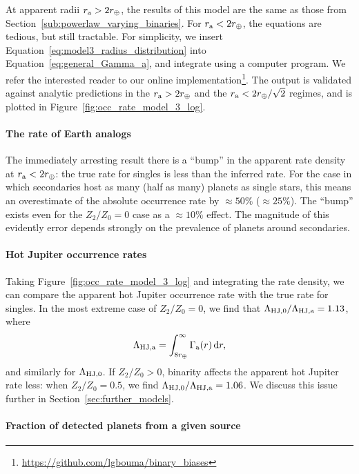\documentclass[12pt,modern]{aastex61}
\renewcommand{\a}{_{\rm a}}
\begin{document}
At apparent radii $r\a > 2r_\oplus$, the results of this model are the same as 
those from Section~\ref{sub:powerlaw_varying_binaries}.
For $r\a < 2r_\oplus$, the equations are tedious, but still tractable.
For simplicity, we insert Equation~\ref{eq:model3_radius_distribution} into 
Equation~\ref{eq:general_Gamma_a}, and integrate using a computer 
program. We refer the interested reader to our online 
implementation\footnote{\url{https://github.com/lgbouma/binary_biases}}.
The output is validated against analytic predictions in the $r\a > 
2r_\oplus$ and the $r\a < 2r_\oplus/\sqrt{2}$ regimes, and is plotted in
Figure~\ref{fig:occ_rate_model_3_log}.


\paragraph{The rate of Earth analogs}
The immediately arresting result there is a ``bump'' in the apparent rate 
density at $r\a < 2r_\oplus$: the true rate for singles is less than the 
inferred rate.
For the case in which secondaries host as many (half as many) planets as 
single stars, this means an overestimate of the absolute occurrence rate by 
$\approx 50\%$ ($\approx 25\%$).
The ``bump'' exists even for the $Z_2/Z_0=0$ case as a $\approx 10\%$ effect.
The magnitude of this evidently error depends strongly on the prevalence of 
planets around secondaries.

\paragraph{Hot Jupiter occurrence rates}
Taking Figure~\ref{fig:occ_rate_model_3_log} and integrating the rate density, 
we can compare the apparent hot Jupiter 
occurrence rate with the true rate for singles.
In the most extreme case of $Z_2/Z_0=0$, we find that $\Lambda_{{\rm 
HJ},0}/\Lambda_{\rm HJ,a} = 1.13$, where
\begin{equation}
\Lambda_{\rm HJ,a} = \int_{8r_\oplus}^{\infty} \Gamma\a(r)\,{\rm d}r,
\end{equation}
and similarly for $\Lambda_{\rm HJ,0}$.
If $Z_2/Z_0>0$, binarity affects the apparent hot Jupiter rate less: when 
$Z_2/Z_0=0.5$, we find $\Lambda_{{\rm HJ},0}/\Lambda_{\rm HJ,a} = 1.06$.
We discuss this issue further in Section~\ref{sec:further_models}.

\paragraph{Fraction of detected planets from a given source}
\end{document}

